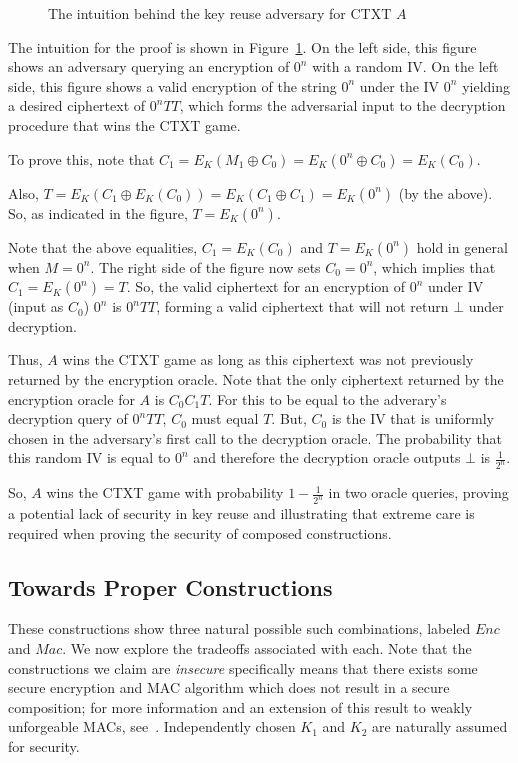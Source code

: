 \begin{figure}
\centering
\scalebox{0.6}{}
  \caption{The intuition behind the key reuse adversary for CTXT $A$}
\label{fig:reuseadversary}
\end{figure}

The intuition for the proof is shown in Figure~\ref{fig:reuseadversary}.  On the left side, this figure shows an adversary querying an encryption of 
$0^n$ with a random IV.  On the left side, this figure shows a valid encryption of the string $0^n$ under the IV $0^n$ yielding a desired ciphertext 
of $0^nTT$, which forms the adversarial input to the decryption procedure that wins the CTXT game.

To prove this, note that $C_1 = E_K(M_1 \oplus C_0) = E_K(0^n \oplus C_0) = E_K(C_0)$.

Also, $T=E_K(C_1 \oplus E_K(C_0))=E_K(C_1 \oplus C_1) = E_K(0^n)$ (by the above).  So, as indicated in the figure, $T=E_K(0^n)$.

Note that the above equalities, $C_1=E_K(C_0)$ and $T=E_K(0^n)$ hold in general when $M=0^n$.  The right side of the figure now sets $C_0=0^n$, which 
implies that $C_1=E_K(0^n)=T$.  So, the valid ciphertext for an encryption of $0^n$ under IV (input as $C_0$) $0^n$ is $0^nTT$, forming a valid 
ciphertext that will not return $\bot$ under decryption.

Thus, $A$ wins the CTXT game as long as this ciphertext was not previously returned by the encryption oracle.  Note that the only ciphertext returned 
by the encryption oracle for $A$ is $C_0C_1T$.  For this to be equal to the adverary's decryption query of $0^nTT$, $C_0$ must equal $T$.  But, $C_0$ 
is the IV that is uniformly chosen in the adversary's first call to the decryption oracle.  The probability that this random IV is equal to $0^n$ and 
therefore the decryption oracle outputs $\bot$ is $\frac{1}{2^n}$.

So, $A$ wins the CTXT game with probability $1-\frac{1}{2^n}$ in two oracle queries, proving a potential lack of security in key reuse and 
illustrating that extreme care is required when proving the security of composed constructions.

\subsection{Towards Proper Constructions}

These constructions show three natural possible such combinations, labeled $Enc$ and $Mac$.  We now explore the tradeoffs associated with each.  Note 
that the constructions we claim are \emph{insecure} specifically means that there exists some secure encryption and MAC algorithm which does not 
result in a secure composition; for more information and an extension of this result to weakly unforgeable MACs, see~\cite{Bellare2000}.  
Independently chosen $K_1$ and $K_2$ are naturally assumed for security.


